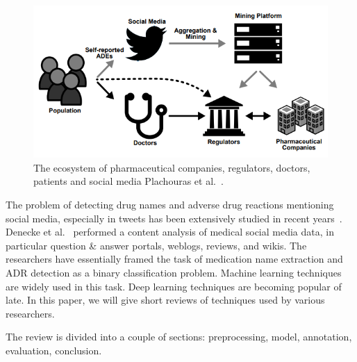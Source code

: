 \begin{figure}[h]
	\centering
	\includegraphics[width=0.99\linewidth]{Figures/j.png}
	\caption{The ecosystem of pharmaceutical companies, regulators, doctors, patients and social media Plachouras et al.~\cite{plachouras2016quantifying}.}
	\label{fig:ecosystem-pharmaceutical}
\end{figure}

The problem of detecting drug names and adverse drug reactions mentioning social media, especially in tweets has been extensively studied in recent years~\cite{weissenbacher2018overview}. Denecke et al.~\cite{DENECKE20091870} performed a content analysis of medical social media data, in particular question \& answer portals, weblogs, reviews, and wikis. The researchers have essentially framed the task of medication name extraction and ADR detection as a binary classification problem. Machine learning techniques are widely used in this task. Deep learning techniques are becoming popular of late. In this paper, we will give short reviews of techniques used by various researchers. 

The review is divided into a couple of sections: preprocessing, model, annotation, evaluation, conclusion.